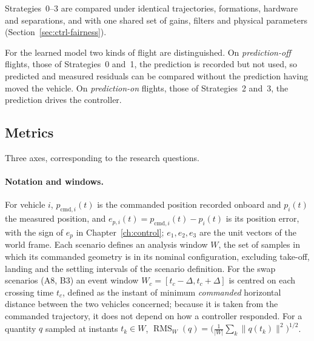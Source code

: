 Strategies~0--3 are compared under identical trajectories, formations, hardware and separations,
and with one shared set of gains, filters and physical parameters (Section~\ref{sec:ctrl-fairness}).

For the learned model two kinds of flight are distinguished. On \emph{prediction-off} flights,
those of Strategies~0 and~1, the prediction is recorded but not used, so predicted and measured
residuals can be compared without the prediction having moved the vehicle. On
\emph{prediction-on} flights, those of Strategies~2 and~3, the prediction drives the controller.

\subsection{Metrics}
\label{sec:setup-metrics}

Three axes, corresponding to the research questions.

\paragraph{Notation and windows.} For vehicle $i$, $p_{\mathrm{cmd},i}(t)$ is the commanded position
recorded onboard and $p_i(t)$ the measured position, and $e_{p,i}(t) = p_{\mathrm{cmd},i}(t) - p_i(t)$ is its
position error, with the sign of $e_p$ in Chapter~\ref{ch:control}; $e_1, e_2, e_3$ are the unit
vectors of the world frame.
Each scenario defines an analysis window $W$, the set of samples in which its commanded geometry is
in its nominal configuration, excluding take-off, landing and the settling intervals of the
scenario definition. For the swap scenarios (A8, B3) an event window
$W_c = [t_c - \Delta, t_c + \Delta]$ is centred on each crossing time $t_c$, defined as the instant
of minimum \emph{commanded} horizontal distance between the two vehicles concerned; because it is
taken from the commanded trajectory, it does not depend on how a controller responded.
For a quantity $q$ sampled at instants $t_k \in W$, $\operatorname{RMS}_W(q) =
\big(\tfrac{1}{\lvert W\rvert}\sum_{k} \lVert q(t_k)\rVert^2\big)^{1/2}$.

